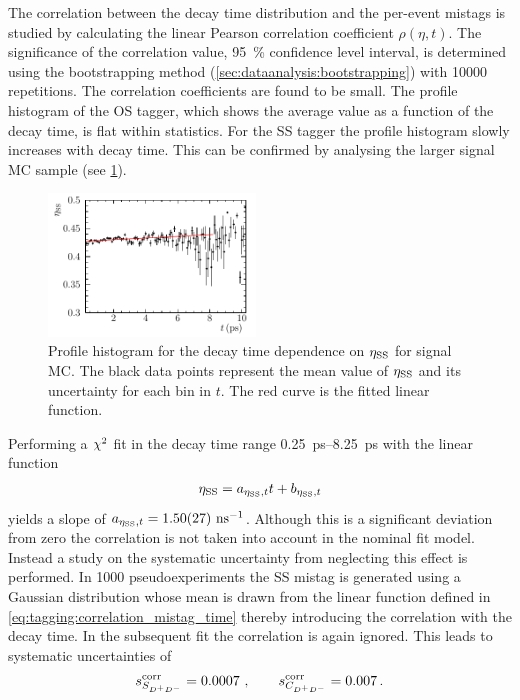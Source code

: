 The correlation between the decay time distribution and the per-event mistags
is studied by calculating the linear Pearson correlation coefficient
$\rho(\eta,t)$. The significance of the correlation value, \ie
\SI{95}{\percent} confidence level interval, is determined using the
bootstrapping method (\cref{sec:dataanalysis:bootstrapping}) with \num{10000}
repetitions. The correlation coefficients are found to be small. The profile
histogram of the OS tagger, which shows the average \etaos value as a function
of the decay time, is flat within statistics. For the SS tagger the profile
histogram slowly increases with decay time. This can be confirmed by analysing
the larger signal MC sample (see
\cref{fig:b02dd:systematics:correlation_mistag_time:etass_time_profile_MC}).
\begin{figure}[htb]
\centering
\includegraphics[width=0.49\textwidth]{07-B02DD/tikz/pdf/Profile_DecayTime_SS.pdf}
\caption{Profile histogram for the decay time dependence on $\etass$ for
signal MC. The black data points represent the mean value of $\etass$ and its
uncertainty for each bin in $t$. The red curve is the fitted linear function.}
\label{fig:b02dd:systematics:correlation_mistag_time:etass_time_profile_MC}
\end{figure}
Performing a $\chisq$ fit in the decay time range \SIrange{0.25}{8.25}{\ps}
with the linear function
\begin{align}
  \etass = a_{\etass,t} t + b_{\etass,t}
  \label{eq:tagging:correlation_mistag_time}
\end{align}
yields a slope of $a_{\etass,t} = \SI{1.50\pm0.27}{\invns}$. Although this is
a significant deviation from zero the correlation is not taken into account in
the nominal fit model. Instead a study on the systematic uncertainty from
neglecting this effect is performed. In \num{1000} pseudoexperiments the SS
mistag is generated using a Gaussian distribution whose mean is drawn from the
linear function defined in \cref{eq:tagging:correlation_mistag_time} thereby
introducing the correlation with the decay time. In the subsequent fit the
correlation is again ignored. This leads to systematic uncertainties of
\begin{align*}
s_{\SDD}^{\text{corr}} = \num{0.0007}\ , \qquad s_{\CDD}^{\text{corr}} = \num{0.007}\,.
\end{align*}

